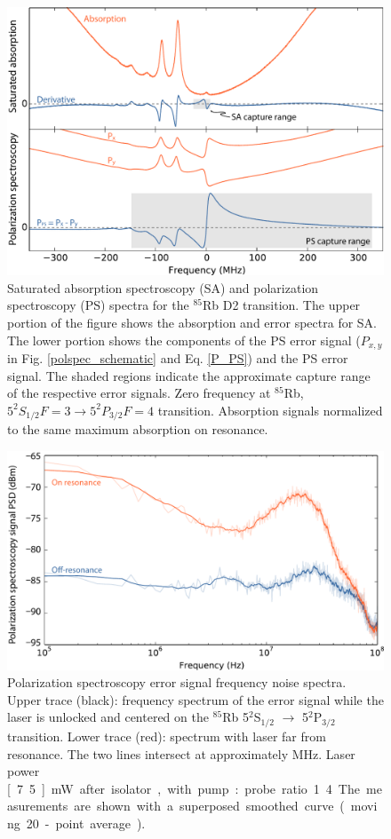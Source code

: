 \begin{figure}[htbp]
    \centering
    \includegraphics[width=\linewidth]{chapter1/Figs/fig2_v1.pdf}
    \caption{Saturated absorption spectroscopy (SA) and polarization spectroscopy (PS) spectra for the $^{85}$Rb D2 transition.
The upper portion of the figure shows the absorption and error spectra for SA.
The lower portion shows the components of the PS error signal ($P_{x,y}$ in Fig. \ref{polspec_schematic} and Eq. \ref{P_PS}) and the PS error signal.
The shaded regions indicate the approximate capture range of the respective error signals.
Zero frequency at $^{85}$Rb, $5^2S_{1/2} F=3\rightarrow5^2P_{3/2} F=4$ transition.
Absorption signals normalized to the same maximum absorption on resonance.}
    \label{sa_ps_spectra}
\end{figure}

\begin{figure}[hbp]
    \centering
    \includegraphics[width=\linewidth]{chapter1/Figs/fig3_v1.pdf}
    \caption{Polarization spectroscopy error signal frequency noise spectra.
Upper trace (black): frequency spectrum of the error signal while the laser is unlocked and centered on the $^{85}$Rb 5$^\text{2}$S$_\text{1/2}$ $\rightarrow$ 5$^\text{2}$P$_\text{3/2}$ transition.
Lower trace (red): spectrum with laser far from resonance.
The two lines intersect at approximately \unit[83]{MHz}.
Laser power \unit[7.5]{mW} after isolator, with pump:probe ratio 1.4.
The measurements are shown with a superposed smoothed curve (moving 20-point average).}
    \label{bandwidth}
\end{figure}

